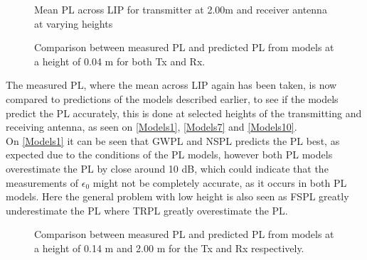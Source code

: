 \begin{figure}[!htbp]
\centering

\caption{Mean PL across LIP for transmitter at 2.00m and receiver antenna at varying heights}
\label{Meas3}
\end{figure}




\begin{figure}[H]
\centering

\caption{Comparison between measured PL and predicted PL from models at a height of 0.04 m for both Tx and Rx.}
\label{Models1}
\end{figure}

\newpage
The measured PL, where the mean across LIP again has been taken, is now compared to predictions of the models described earlier, to see if the models predict the PL accurately, this is done at selected heights of the transmitting and receiving antenna, as seen on \autoref{Models1}, \autoref{Models7} and \autoref{Models10}.\\




On \autoref{Models1} it can be seen that GWPL and NSPL predicts the PL best, as expected due to the conditions of the PL models, however both PL models overestimate the PL by close around 10 dB, which could indicate that the measurements of $\epsilon_0$ might not be completely accurate, as it occurs in both PL models. Here the general problem with low height is also seen as FSPL greatly underestimate the PL where TRPL greatly overestimate the PL.

\begin{figure}[H]
\centering

\caption{Comparison between measured PL and predicted PL from models at a height of 0.14 m and 2.00 m for the Tx and Rx respectively.}
\label{Models7}
\end{figure}

